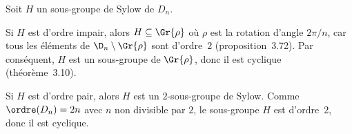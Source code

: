 Soit $H$ un sous-groupe de Sylow de $D_n$.

Si $H$ est d'ordre impair, alors $H\subseteq\Gr{\rho}$ où $\rho$ est la rotation d'angle $2\pi/n$, car tous les éléments de $\D_n\setminus\Gr{\rho}$ sont d'ordre~$2$ (proposition~3.72).
Par conséquent, $H$ est un sous-groupe de $\Gr{\rho}$, donc il est cyclique (théorème~3.10).

Si $H$ est d'ordre pair, alors $H$ est un $2$-sous-groupe de Sylow.
Comme $\ordre(D_n) = 2n$ avec $n$ non divisible par $2$, le sous-groupe $H$ est d'ordre~$2$, donc il est cyclique.
